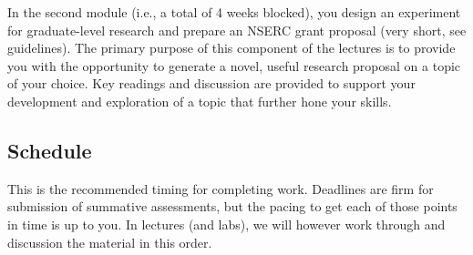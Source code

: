 \documentclass[
]{book}
\begin{document}
In the second module (i.e., a total of 4 weeks blocked), you design an experiment for graduate-level research and prepare an NSERC grant proposal (very short, see guidelines). The primary purpose of this component of the lectures is to provide you with the opportunity to generate a novel, useful research proposal on a topic of your choice. Key readings and discussion are provided to support your development and exploration of a topic that further hone your skills.

\hypertarget{schedule}{%
\subsection*{Schedule}\label{schedule}}

This is the recommended timing for completing work. Deadlines are firm for submission of summative assessments, but the pacing to get each of those points in time is up to you. In lectures (and labs), we will however work through and discussion the material in this order.
\end{document}
